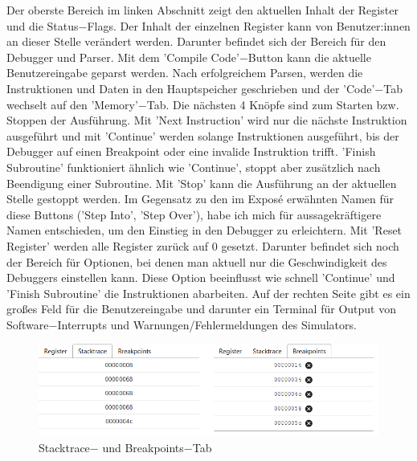 \documentclass[a4paper, 11pt, onecolumn]{article}
\begin{document}
Der oberste Bereich im linken Abschnitt zeigt den aktuellen Inhalt der Register und die Status$-$Flags. Der Inhalt der einzelnen Register kann von Benutzer:innen an dieser Stelle verändert werden. Darunter befindet sich der Bereich für den Debugger und Parser. Mit dem 'Compile Code'$-$Button kann die aktuelle Benutzereingabe geparst werden. Nach erfolgreichem Parsen, werden die Instruktionen und Daten in den Hauptspeicher geschrieben und der 'Code'$-$Tab wechselt auf den 'Memory'$-$Tab. Die nächsten 4 Knöpfe sind zum Starten bzw. Stoppen der Ausführung. Mit 'Next Instruction' wird nur die nächste Instruktion ausgeführt und mit 'Continue' werden solange Instruktionen ausgeführt, bis der Debugger auf einen Breakpoint oder eine invalide Instruktion trifft. 'Finish Subroutine' funktioniert ähnlich wie 'Continue', stoppt aber zusätzlich nach Beendigung einer Subroutine. Mit 'Stop' kann die Ausführung an der aktuellen Stelle gestoppt werden. Im Gegensatz zu den im Exposé erwähnten Namen für diese Buttons ('Step Into', 'Step Over'), habe ich mich für aussagekräftigere Namen entschieden, um den Einstieg in den Debugger zu erleichtern. Mit 'Reset Register' werden alle Register zurück auf 0 gesetzt. Darunter befindet sich noch der Bereich für Optionen, bei denen man aktuell nur die Geschwindigkeit des Debuggers einstellen kann. Diese Option beeinflusst wie schnell 'Continue' und 'Finish Subroutine' die Instruktionen abarbeiten. Auf der rechten Seite gibt es ein großes Feld für die Benutzereingabe und darunter ein Terminal für Output von Software$-$Interrupts und Warnungen/Fehlermeldungen des Simulators.

\begin{figure}[!htb]
\centering
\includegraphics[width=1\textwidth]{data/stackBreak}
\caption[Benutzeroberfläche $-$ Stacktrace und Breakpoints]{Stacktrace$-$ und Breakpoints$-$Tab}
\label{fig:stackbreak}
\end{figure}
\end{document}
